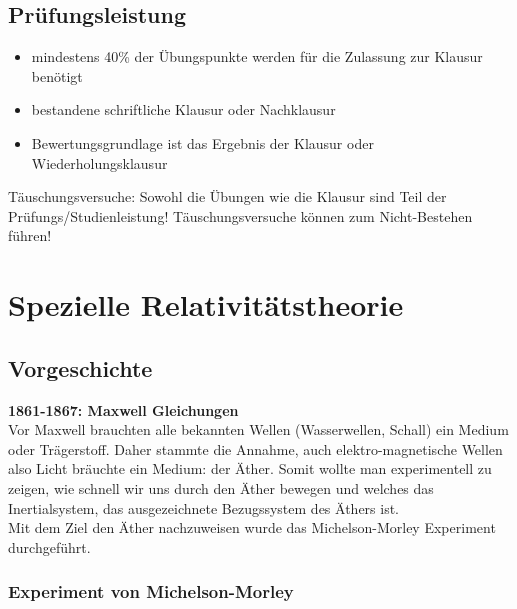 \documentclass[titlepage,11pt,a4paper,ngerman]{report}
\begin{document}
\section{Prüfungsleistung}
\begin{itemize}
	\item mindestens 40\% der Übungspunkte werden für die Zulassung zur Klausur benötigt
	\item bestandene schriftliche Klausur oder Nachklausur
	\item Bewertungsgrundlage ist das Ergebnis der Klausur oder Wiederholungsklausur
\end{itemize}

Täuschungsversuche:
Sowohl die Übungen wie die Klausur sind Teil der Prüfungs/Studienleistung! Täuschungsversuche können zum Nicht-Bestehen führen!


\renewcommand{\thechapter}{\Roman{chapter}}
\chapter{Spezielle Relativitätstheorie}

\section{Vorgeschichte}

\textbf{1861-1867: Maxwell Gleichungen}\\
Vor Maxwell brauchten alle bekannten Wellen (Wasserwellen, Schall) ein Medium oder Trägerstoff. Daher stammte die Annahme, auch elektro-magnetische Wellen also Licht bräuchte ein Medium: der Äther. Somit wollte man experimentell zu zeigen, wie schnell wir uns durch den Äther bewegen und welches das Inertialsystem, das ausgezeichnete Bezugssystem des Äthers ist.\\
Mit dem Ziel den Äther nachzuweisen wurde das Michelson-Morley Experiment durchgeführt.

\subsection{Experiment von Michelson-Morley}%
\end{document}

